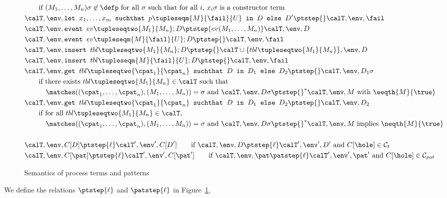 \documentclass{book}
\begin{document}
\begin{figure}[p]
\begin{align*}
&\qquad\text{if $(M_1,\ldots,M_n)\sigma \not\in \defp$ for all $\sigma$ such that for all $i$, $x_i\sigma$ is a constructor term}\\
&\calT, \env, \texttt{let } x_1,\ldots,x_m \texttt{ suchthat } p\tupleseqm{M}{\fail}{U} \texttt{ in } D \texttt{ else } D' \ptstep{} \calT, \env, \fail\\
&\calT, \env,\texttt{event } ev\tupleseqtwo{M_1}{M_n}; D \ptstep{ev(M_1,\ldots,M_n)} \calT, \env, D\\
&\calT, \env,\texttt{event } ev\tupleseqm{M}{\fail}{U}; D \ptstep{} \calT, \env, \fail\\
&\calT, \env,\texttt{insert } tbl\tupleseqtwo{M_1}{M_n}; D \ptstep{} \calT \cup \{ tbl\tupleseqtwo{M_1}{M_n} \}, \env, D\\
&\calT, \env,\texttt{insert } tbl\tupleseqm{M}{\fail}{U}; D \ptstep{} \calT, \env, \fail\\
&\calT, \env, \texttt{get } tbl\tupleseqtwo{\cpat_1}{\cpat_n} \texttt{ suchthat } D \texttt{ in } D_1 \texttt{ else } D_2 \ptstep{} \calT, \env, D_1\sigma\\
&\qquad\text{if there exists $tbl\tupleseqtwo{M_1}{M_n} \in \calT$ such that}\\
&\qquad\quad\text{$\matches((\cpat_1,\ldots,\cpat_n),(M_1,\ldots,M_n)) = \sigma$ and $\calT,\env,D\sigma \ptstep{}^* \calT,\env,M$ with $\eeqth{M}{\true}$}\\
&\calT, \env, \texttt{get } tbl\tupleseqtwo{\cpat_1}{\cpat_n} \texttt{ suchthat } D \texttt{ in } D_1 \texttt{ else } D_2 \ptstep{} \calT, \env, D_2\\
&\qquad\text{if for all $tbl\tupleseqtwo{M_1}{M_n} \in \calT$,}\\
&\qquad\quad\text{$\matches((\cpat_1,\ldots,\cpat_n),(M_1,\ldots,M_n)) = \sigma$ and $\calT,\env,D\sigma \ptstep{}^* \calT,\env,M$ implies $\neqth{M}{\true}$}\\
&\\
&\calT, \env, C[D] \ptstep{\ell} \calT',\env',C[D']\qquad\text{if } \calT, \env, D \ptstep{\ell} \calT',\env',D' \text{ and } C[\hole] \in \mathcal{C}_t\\
&\calT, \env, C[\pat] \ptstep{\ell} \calT',\env',C[\pat']\qquad\text{if } \calT, \env, \pat \patstep{\ell} \calT',\env',\pat' \text{ and } C[\hole] \in \mathcal{C}_{pat}
\end{align*}
\caption{Semantics of process terms and patterns}\label{fig:sem1}
\end{figure}
We define the relations $\ptstep{\ell}$ and $\patstep{\ell}$ in Figure~\ref{fig:sem1},
\end{document}
